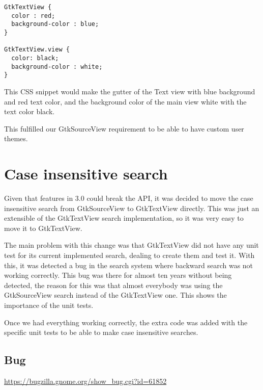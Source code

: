 \begin{lstlisting}[style=plain]
GtkTextView {
  color : red;
  background-color : blue;
}

GtkTextView.view {
  color: black;
  background-color : white;
}
\end{lstlisting}

This CSS snippet would make the gutter of the Text view with blue background and red text color, and the background color of the 
main view white with the text color black.

This fulfilled our GtkSourceView requirement to be able to have custom user themes.

\section{Case insensitive search}

Given that features in 3.0 could break the API, it was decided to move the case insensitive search from GtkSourceView 
to GtkTextView directly. This was just an extensible of the GtkTextView search implementation, so it was very easy to move it to GtkTextView.

The main problem with this change  was that GtkTextView did not have any unit test for its current implemented search, 
dealing to create them and test it.   With this, it was detected a bug in the search system where backward search was 
not working correctly. This bug was there for almost ten years without being detected, the reason for this was that 
almost everybody was using the GtkSourceView search instead of the GtkTextView one. This shows the importance of the unit tests.

Once we had everything working correctly, the extra code was added with the specific unit tests to be able to make 
case insensitive searches.

\subsection{Bug}

\noindent\url{https://bugzilla.gnome.org/show_bug.cgi?id=61852}
